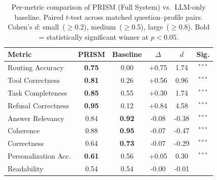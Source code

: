 \begin{table}[t]
\centering
\small
\caption{Per-metric comparison of PRISM (Full System) vs.\ LLM-only baseline. Paired $t$-test across matched question--profile pairs. Cohen's $d$: small~($\geq$0.2), medium~($\geq$0.5), large~($\geq$0.8). Bold = statistically significant winner at $p < 0.05$.}
\label{tab:significance}
\begin{tabular}{@{}lccccc@{}}
\toprule
Metric & PRISM & Baseline & $\Delta$ & $d$ & Sig. \\
\midrule
Routing Accuracy & \textbf{0.75} & 0.00 & +0.75 & 1.74 & $^{***}$ \\
Tool Correctness & \textbf{0.81} & 0.26 & +0.56 & 0.96 & $^{***}$ \\
Task Completeness & \textbf{0.85} & 0.55 & +0.30 & 1.74 & $^{***}$ \\
Refusal Correctness & \textbf{0.95} & 0.12 & +0.84 & 4.58 & $^{***}$ \\
Answer Relevancy & 0.84 & \textbf{0.92} & -0.08 & -0.38 & $^{***}$ \\
Coherence & 0.88 & \textbf{0.95} & -0.07 & -0.47 & $^{***}$ \\
Correctness & 0.64 & \textbf{0.73} & -0.07 & -0.29 & $^{***}$ \\
Personalization Acc. & \textbf{0.61} & 0.56 & +0.05 & 0.30 & $^{***}$ \\
Readability & 0.54 & 0.54 & -0.00 & -0.01 &  \\
\bottomrule
\end{tabular}
\end{table}
